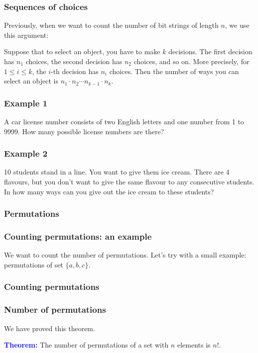 \begin{frame}\frametitle{Sequences of choices}
  Previously, when we want to count the number of bit strings of
  length $n$, we use this argument:

  \begin{tcolorbox}
    Suppose that to select an object, you have to make $k$ decisions.
    The first decision has $n_1$ choices, the second decision has
    $n_2$ choices, and so on.  More precisely, for $1\leq i\leq k$,
    the $i$-th decision has $n_i$ choices.  Then the number of ways
    you can select an object is $n_1\cdot n_2\cdots n_{k-1}\cdot n_k$.
  \end{tcolorbox}
\end{frame}

\begin{frame}\frametitle{Example 1}
  \begin{tcolorbox}
    A car license number consists of two English letters and one
    number from 1 to 9999.  How many possible license numbers are
    there?
  \end{tcolorbox}
  \vspace{2in}
\end{frame}

\begin{frame}\frametitle{Example 2}
  \begin{tcolorbox}
    10 students stand in a line.  You want to give them ice cream.
    There are 4 flavours, but you don't want to give the same flavour
    to any consecutive students.  In how many ways can you give out
    the ice cream to these students?
  \end{tcolorbox}
  \vspace{2in}
\end{frame}

\begin{frame}\frametitle{Permutations}
\end{frame}

\begin{frame}\frametitle{Counting permutations: an example}
  We want to count the number of permutations.  Let's try with a small
  example: permutations of set $\{a,b,c\}$.

  \vspace{2.5in}
\end{frame}

\begin{frame}\frametitle{Counting permutations}
\end{frame}

\begin{frame}\frametitle{Number of permutations}
  We have proved this theorem.
  \begin{tcolorbox}
    {\bf \textcolor{blue}{Theorem:}} The number of permutations of a
    set with $n$ elements is $n!$.
  \end{tcolorbox}
\end{frame}



